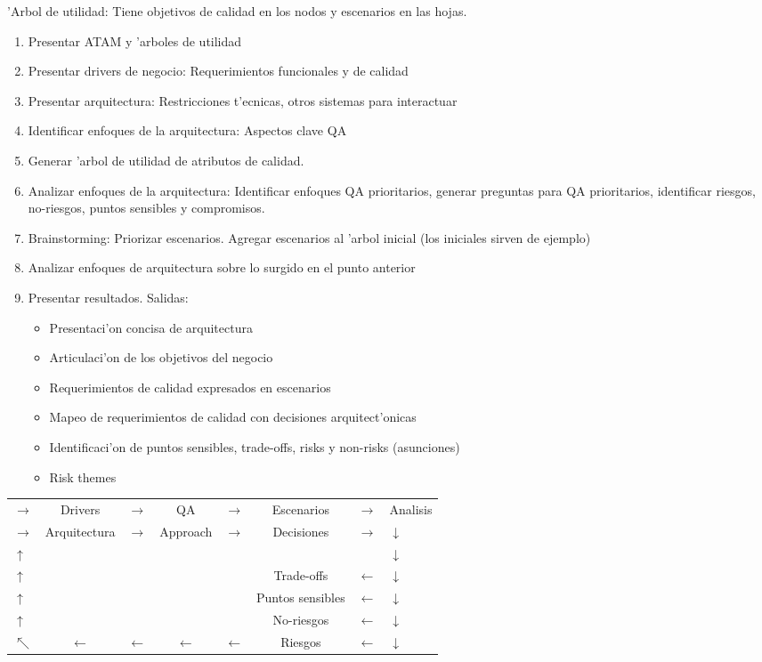 \documentclass[a4paper,spanish]{article}
\newenvironment{items}{
		\vspace*{-\topsep}
		\begin{itemize} 
		\addtolength{\itemsep}{-0.5\baselineskip}
		}{\end{itemize}\vspace*{-\topsep}}
\newenvironment{numbers}{
		\vspace*{-\topsep}
		\begin{enumerate} 
		\addtolength{\itemsep}{-0.5\baselineskip}
		}{\end{enumerate}\vspace*{-\topsep}}
\begin{document}
'Arbol de utilidad: Tiene objetivos de calidad en los nodos y escenarios en 
	las hojas.

\begin{numbers}
\item Presentar ATAM y 'arboles de utilidad
\item Presentar drivers de negocio: Requerimientos funcionales y de calidad
\item Presentar arquitectura: Restricciones t'ecnicas, otros sistemas para
	interactuar
\item Identificar enfoques de la arquitectura: Aspectos clave QA
\item Generar 'arbol de utilidad de atributos de calidad.
\item Analizar enfoques de la arquitectura: Identificar enfoques QA 
	prioritarios, generar preguntas para QA prioritarios, identificar riesgos,
	no-riesgos, puntos sensibles y compromisos.
\item Brainstorming: Priorizar escenarios. Agregar escenarios al 'arbol 
	inicial (los iniciales sirven de ejemplo)
\item Analizar enfoques de arquitectura sobre lo surgido en el punto anterior
\item Presentar resultados. Salidas:
	\begin{items}
	\item Presentaci'on concisa de arquitectura
	\item Articulaci'on de los objetivos del negocio
	\item Requerimientos de calidad expresados en escenarios
	\item Mapeo de requerimientos de calidad con decisiones arquitect'onicas
	\item Identificaci'on de puntos sensibles, trade-offs, risks y non-risks
		(asunciones)
	\item Risk themes
	\end{items}
\end{numbers}

\begin{tabular}{lccccccl}
$\longrightarrow$ & Drivers & $\rightarrow$ & QA & $\rightarrow$ & Escenarios & $\longrightarrow$ & Analisis \\
$\longrightarrow$ & Arquitectura & $\rightarrow$ & Approach & $\rightarrow$ & Decisiones & $\longrightarrow$ & $\downarrow$ \\
$\uparrow$ & & & & & & & $\downarrow$ \\
$\uparrow$ & & & & & Trade-offs & $\longleftarrow$ & $\downarrow$ \\
$\uparrow$ & & & & & Puntos sensibles & $\longleftarrow$ & $\downarrow$ \\
$\uparrow$ & & & & & No-riesgos & $\longleftarrow$ & $\downarrow$ \\
$\nwarrow$ & $\longleftarrow$ & $\leftarrow$ & $\longleftarrow$ & $\leftarrow$ & Riesgos & $\longleftarrow$ & $\downarrow$ \\
\end{tabular}
\end{document}
